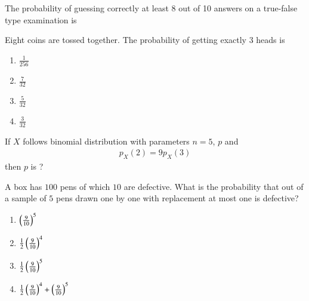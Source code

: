 \solution

\item The probability of guessing correctly at least 8 out of 10 answers on a true-false
type examination is\\
\solution
\item Eight coins are tossed together. The probability of getting exactly 3 heads is\\
\begin{enumerate}
\item 
$\frac{1}{256}$\\
\item 
$\frac{7}{32}$\\
\item 
$\frac{5}{32}$\\
\item 
$\frac{3}{32}$\\
\end{enumerate}
\item If $X$ follows binomial distribution with parameters $n = 5$, $p$ and 
\begin{align}
p_X(2) = 9p_X(3)
\end{align}
then $p$ is ?

\item A box has $100$ pens of which $10$ are defective. What is the probability that out of a sample of $5$ pens drawn one by one with replacement at most one is defective?
\begin{enumerate}[label=(\alph*)]
\item $\left(\frac{9}{10}\right)^5$
\item $\frac{1}{2}\left(\frac{9}{10}\right)^4$
\item $\frac{1}{2}\left(\frac{9}{10}\right)^5$
\item $\frac{1}{2}\left(\frac{9}{10}\right)^4 + \left(\frac{9}{10}\right)^5$
\end{enumerate}

